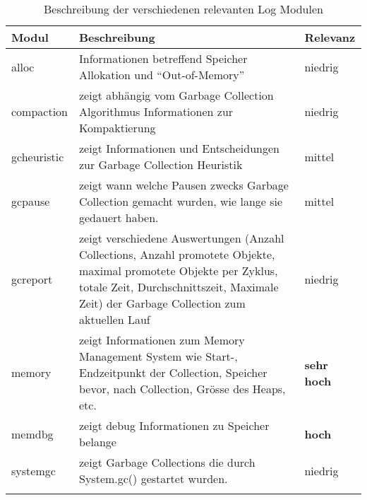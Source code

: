 \begin{longtable}{|p{4cm}|p{9cm}|p{2cm}|}
  \hline
  \textbf{Modul} & \textbf{Beschreibung} & \textbf{Relevanz}\\\hline
  alloc & Informationen betreffend Speicher Allokation und ``Out-of-Memory'' & niedrig \\\hline
  compaction & zeigt abhängig vom Garbage Collection Algorithmus Informationen zur Kompaktierung& niedrig \\\hline
  gcheuristic & zeigt Informationen und Entscheidungen zur Garbage Collection Heuristik & mittel \\\hline
  gcpause & zeigt wann welche Pausen zwecks Garbage Collection gemacht wurden, wie lange sie gedauert haben. & mittel \\\hline
  gcreport & zeigt verschiedene Auswertungen (Anzahl Collections, Anzahl promotete Objekte, maximal promotete Objekte per Zyklus, totale Zeit, Durchschnittszeit, Maximale Zeit) der Garbage Collection zum aktuellen Lauf& niedrig \\\hline
  memory & zeigt Informationen zum Memory Management System wie Start-, Endzeitpunkt der Collection, Speicher bevor, nach Collection, Grösse des Heaps, etc.& \textbf{sehr hoch} \\\hline
  memdbg & zeigt debug Informationen zu Speicher belange& \textbf{hoch} \\\hline
  systemgc & zeigt Garbage Collections die durch System.gc() gestartet wurden. & niedrig \\\hline
    \caption{Beschreibung der verschiedenen relevanten Log Modulen}
\end{longtable}